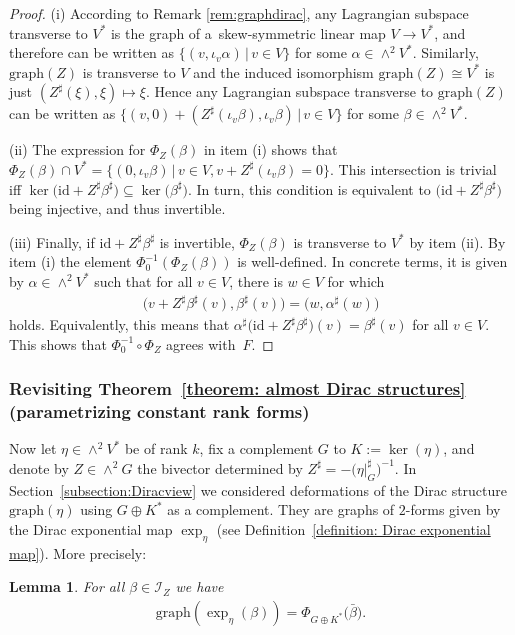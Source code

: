 \documentclass[pdftex]{sigma}
\numberwithin{equation}{section}
\newtheorem{Lemma}[Theorem]{Lemma}
\renewcommand{\graph}{\mathrm{graph}}
\renewcommand{\graph}{\mathrm{graph}}
\begin{document}
\begin{proof}(i) According to Remark \ref{rem:graphdirac}, any Lagrangian subspace transverse to $V^*$ is the graph of a~skew-symmetric linear map $V\to V^*$, and therefore can be written as $\{(v,\iota_v\alpha)\,|\,v\in V\}$ for some $\alpha\in \wedge^2 V^*$. Similarly, $\mathrm{graph}(Z)$ is transverse to $V$ and the induced isomorphism $\mathrm{graph}(Z)\cong V^*$ is just $(Z^\sharp(\xi),\xi)\mapsto \xi$. Hence any Lagrangian subspace transverse to $\mathrm{graph}(Z)$ can be written as $\{(v,0)+(Z^\sharp(\iota_v\beta),\iota_v\beta)\,|\,v\in V\}$ for some $\beta\in \wedge^2 V^*$.

(ii) The expression for $\Phi_Z(\beta)$ in item (i) shows that $\Phi_Z(\beta)\cap V^* =\{(0,\iota_v\beta)\,|\,v\in V, v+Z^\sharp(\iota_v\beta)=0\}$. This intersection is trivial if{f} $\ker\big(\mathrm{id} + Z^\sharp \beta^\sharp\big) \subseteq \ker\big(\beta^\sharp\big)$. In turn, this condition is equivalent to $\big(\mathrm{id} + Z^\sharp \beta^\sharp\big)$ being injective, and thus invertible.

(iii) Finally, if $\mathrm{id}+Z^\sharp\beta^\sharp$ is invertible, $\Phi_Z(\beta)$ is transverse to $V^*$ by item (ii). By item (i) the element $\Phi_0^{-1}(\Phi_Z(\beta))$ is well-defined. In concrete terms, {it is given by} $\alpha \in \wedge^2 V^*$ such that for all $v\in V$, there is $w \in V$ for which
\begin{gather*}\big(v + Z^\sharp \beta^\sharp(v),\beta^\sharp(v)\big)=\big(w,\alpha^\sharp(w)\big)\end{gather*}
holds. Equivalently, this means that $\alpha^\sharp\big(\mathrm{id}+Z^\sharp\beta^\sharp\big)(v)=\beta^\sharp(v)$ for all $v\in V$. This shows that $\Phi_0^{-1}\circ \Phi_Z$ agrees with~$F$.
\end{proof}

\subsubsection{{Revisiting Theorem~\ref{theorem: almost Dirac structures} (parametrizing constant rank forms)}}

Now let $\eta \in \wedge^2 V^*$ be of rank $k$, fix a complement $G$ to $K:=\ker(\eta)$, and denote by $Z \in \wedge^2 G$ the bivector determined by $ Z^\sharp=-\big(\eta\vert_G^\sharp\big)^{-1}$. In Section~\ref{subsection:Diracview} we considered deformations of the Dirac structure $\graph(\eta)$ using $G\oplus K^*$ as a complement. They are graphs of $2$-forms given by the Dirac exponential map $\exp_{\eta}$ (see Definition~\ref{definition: Dirac exponential map}). More precisely:
\begin{Lemma}\label{lemma:niceeq} For all $\beta\in \mathcal{I}_Z$ we have
\begin{gather}\label{eq:graphexp}
\mathrm{graph}(\exp_{\eta}(\beta))=\Phi_{G\oplus K^*}\big(\bar{\beta}\big).
\end{gather}
\end{Lemma}
\end{document}
